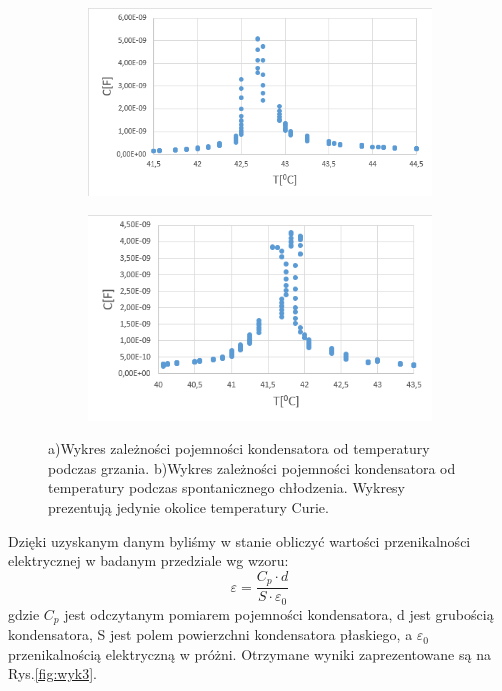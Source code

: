 \documentclass{article}
\begin{document}
\begin{figure}[h!]
  \centering
  \begin{subfigure}[b]{0.49\linewidth}
    \includegraphics[width=\linewidth]{wyk1.png}
    \caption{}
  \end{subfigure}
  \begin{subfigure}[b]{0.49\linewidth}
    \includegraphics[width=\linewidth]{wyk2.png}
    \caption{}
  \end{subfigure}
  \caption{a)Wykres zależności pojemności kondensatora od temperatury podczas grzania. b)Wykres zależności pojemności kondensatora od temperatury podczas spontanicznego chłodzenia. Wykresy prezentują jedynie okolice temperatury Curie.}
  \label{fig:wyk12}
\end{figure}

Dzięki uzyskanym danym byliśmy w stanie obliczyć wartości przenikalności elektrycznej w badanym przedziale wg wzoru:
\begin{equation}
\varepsilon = \dfrac{C_{p}\cdot d}{S \cdot \varepsilon_{0}}
\end{equation}
gdzie $C_{p}$ jest odczytanym pomiarem pojemności kondensatora, d jest grubością kondensatora, S jest polem powierzchni kondensatora płaskiego, a $\varepsilon_{0}$ przenikalnością elektryczną w próżni. Otrzymane wyniki zaprezentowane są na Rys.\ref{fig:wyk3}.
\end{document}
